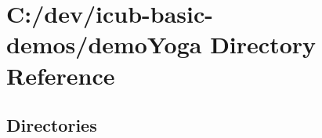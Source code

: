 \section{C\+:/dev/icub-\/basic-\/demos/demo\+Yoga Directory Reference}
\label{dir_ef68c104db6052f7b3e7734a1a1b7a65}
\subsection*{Directories}
\begin{DoxyCompactItemize}
\end{DoxyCompactItemize}
